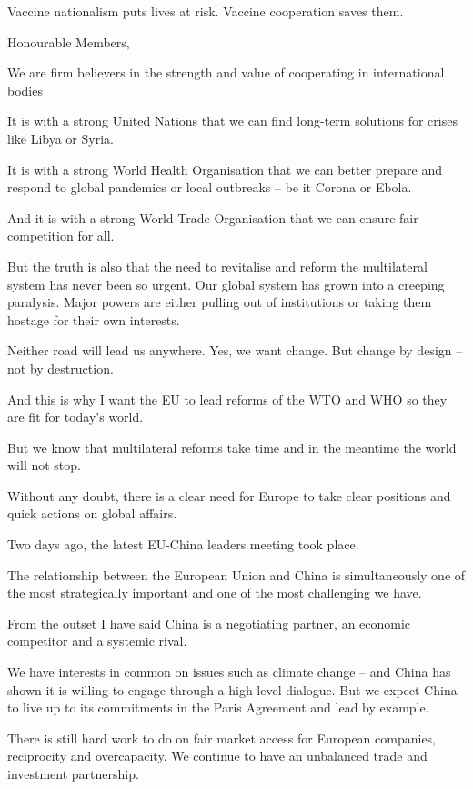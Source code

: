 \documentclass[a4paper,11pt]{article}
\begin{document}
Vaccine nationalism puts lives at risk. Vaccine cooperation saves them.

 

Honourable Members,

We are firm believers in the strength and value of cooperating in international bodies

It is with a strong United Nations that we can find long-term solutions for crises like Libya or Syria.

It is with a strong World Health Organisation that we can better prepare and respond to global pandemics or local outbreaks – be it Corona or Ebola.

And it is with a strong World Trade Organisation that we can ensure fair competition for all.

But the truth is also that the need to revitalise and reform the multilateral system has never been so urgent. Our global system has grown into a creeping paralysis. Major powers are either pulling out of institutions or taking them hostage for their own interests.

Neither road will lead us anywhere. Yes, we want change. But change by design – not by destruction.

And this is why I want the EU to lead reforms of the WTO and WHO so they are fit for today's world. 

But we know that multilateral reforms take time and in the meantime the world will not stop.

Without any doubt, there is a clear need for Europe to take clear positions and quick actions on global affairs.

Two days ago, the latest EU-China leaders meeting took place. 

The relationship between the European Union and China is simultaneously one of the most strategically important and one of the most challenging we have.

From the outset I have said China is a negotiating partner, an economic competitor and a systemic rival.

We have interests in common on issues such as climate change – and China has shown it is willing to engage through a high-level dialogue. But we expect China to live up to its commitments in the Paris Agreement and lead by example.

There is still hard work to do on fair market access for European companies, reciprocity and overcapacity. We continue to have an unbalanced trade and investment partnership.
\end{document}
